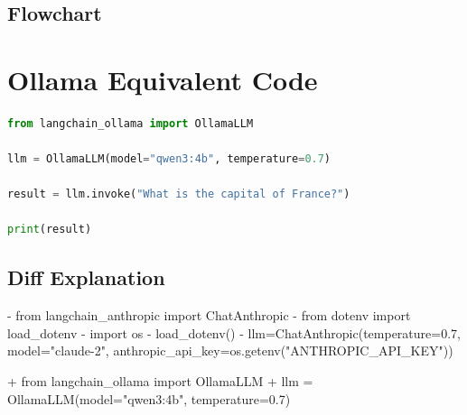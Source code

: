\documentclass[11pt, a4paper]{article}
\begin{document}
\subsection{Flowchart}

\section{Ollama Equivalent Code}
\begin{lstlisting}[language=Python]
from langchain_ollama import OllamaLLM

llm = OllamaLLM(model="qwen3:4b", temperature=0.7)

result = llm.invoke("What is the capital of France?")

print(result)
\end{lstlisting}

\subsection{Diff Explanation}
\begin{removedcode}
\begin{diffverb}
- from langchain_anthropic import ChatAnthropic
- from dotenv import load_dotenv
- import os
- load_dotenv()
- llm=ChatAnthropic(temperature=0.7, model="claude-2", anthropic_api_key=os.getenv("ANTHROPIC_API_KEY"))
\end{diffverb}
\end{removedcode}

\begin{addedcode}
\begin{diffverb}
+ from langchain_ollama import OllamaLLM
+ llm = OllamaLLM(model="qwen3:4b", temperature=0.7)
\end{diffverb}
\end{addedcode}
\end{document}
